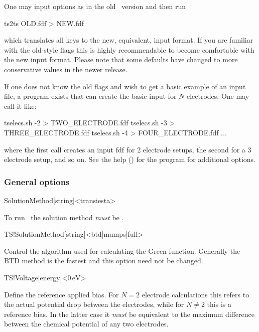%
One may input options as in the old \tsiesta\ version and then run
\begin{fdfexample}
  ts2ts OLD.fdf > NEW.fdf
\end{fdfexample}
which translates all keys to the new, equivalent, input format. If you
are familiar with the old-style flags this is highly recommendable to
become comfortable with the new input format. Please note that some
defaults have changed to more conservative values in the newer
release. 

If one does not know the old flags and wish to get a basic example of
an input file, a program  exists that can
create the basic input for $N$ electrodes. One may call it like:
\begin{fdfexample}
  tselecs.sh -2 > TWO_ELECTRODE.fdf
  tselecs.sh -3 > THREE_ELECTRODE.fdf
  tselecs.sh -4 > FOUR_ELECTRODE.fdf
  ...
\end{fdfexample}
where the first call creates an input fdf for 2 electrode setups, the
second for a 3 electrode setup, and so on. See the help ()
for the program for additional options.


\subsubsection{General options}

\begin{fdfentry}{SolutionMethod}[string]<transiesta>

  To run \tsiesta\ the solution method \emph{must} be
  .

\end{fdfentry}

\begin{fdfentry}{TS!SolutionMethod}[string]<btd|mumps|full>

  Control the algorithm used for calculating the Green
  function. Generally the BTD method is the fastest and this option
  need not be changed.
  
\end{fdfentry}

\begin{fdfentry}{TS!Voltage}[energy]<$0\,\mathrm{eV}$>

  Define the reference applied bias. For $N=2$ electrode calculations
  this refers to the actual potential drop between the electrodes,
  while for $N\neq2$ this is a reference bias. In the latter case it
  \emph{must} be equivalent to the maximum difference between the
  chemical potential of any two electrodes.
  
\end{fdfentry}

